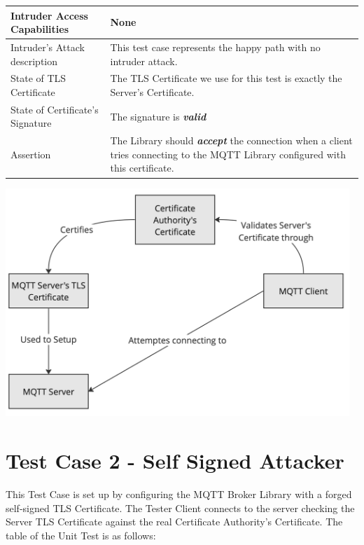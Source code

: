 \documentclass[binding=0.6cm,noexaminfo]{sapthesis}
\begin{document}
\begin{center}
\begin{tabular}{| p{6cm} | p{6cm} |}
\hline
Intruder Access Capabilities & None \\
\hline
Intruder’s Attack description & This test case represents the happy path with no intruder attack. \\
\hline
State of TLS Certificate & The TLS Certificate we use for this test is exactly the Server’s Certificate. \\
\hline
State of Certificate’s Signature & The signature is \textbf{\textit{valid}} \\
\hline
Assertion & The Library should \textbf{\textit{accept}} the connection when a client tries connecting to the MQTT Library configured with this certificate. \\
\hline
\end{tabular}
\end{center}

\includegraphics[width=13cm]{TC1}

\section{Test Case 2 - Self Signed Attacker}
This Test Case is set up by configuring the MQTT Broker Library with a forged self-signed TLS Certificate. The Tester Client connects to the server checking the Server TLS Certificate against the real Certificate Authority’s Certificate. The table of the Unit Test is as follows:
\end{document}
